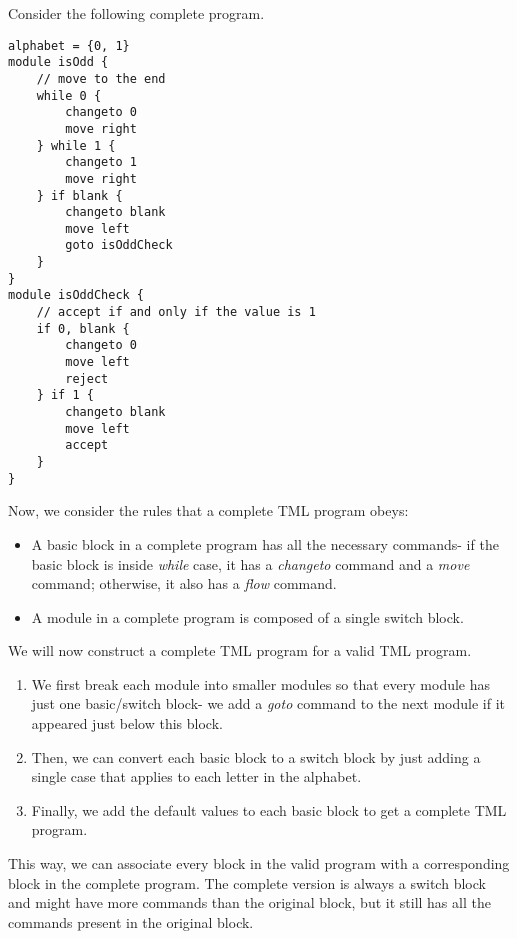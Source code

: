 \documentclass{article}
\begin{document}
    Consider the following complete program.
\begin{lstlisting}[language=TML]
alphabet = {0, 1}
module isOdd {
    // move to the end
    while 0 {
        changeto 0
        move right
    } while 1 {
        changeto 1
        move right
    } if blank {
        changeto blank
        move left
        goto isOddCheck
    }
}
module isOddCheck {
    // accept if and only if the value is 1
    if 0, blank {
        changeto 0
        move left
        reject
    } if 1 {
        changeto blank
        move left
        accept
    }
}
\end{lstlisting}
    Now, we consider the rules that a complete TML program obeys:
    \begin{itemize}
        \item A basic block in a complete program has all the necessary commands- if the basic block is inside \textit{while} case, it has a \textit{changeto} command and a \textit{move} command; otherwise, it also has a \textit{flow} command.
        \item A module in a complete program is composed of a single switch block.
    \end{itemize}

    We will now construct a complete TML program for a valid TML program.
    \begin{enumerate}
        \item We first break each module into smaller modules so that every module has just one basic/switch block- we add a \textit{goto} command to the next module if it appeared just below this block.
        \item Then, we can convert each basic block to a switch block by just adding a single case that applies to each letter in the alphabet.
        \item Finally, we add the default values to each basic block to get a complete TML program.
    \end{enumerate}
    This way, we can associate every block in the valid program with a corresponding block in the complete program. The complete version is always a switch block and might have more commands than the original block, but it still has all the commands present in the original block. 
\end{document}
